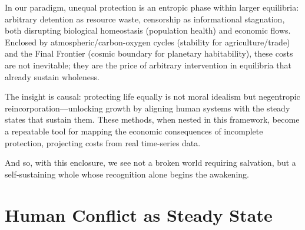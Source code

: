 In our paradigm, unequal protection is an entropic phase within larger equilibria: arbitrary detention as resource waste, censorship as informational stagnation, both disrupting biological homeostasis (population health) and economic flows. Enclosed by atmospheric/carbon-oxygen cycles (stability for agriculture/trade) and the Final Frontier (cosmic boundary for planetary habitability), these costs are not inevitable; they are the price of arbitrary intervention in equilibria that already sustain wholeness.

The insight is causal: protecting life equally is not moral idealism but negentropic reincorporation—unlocking growth by aligning human systems with the steady states that sustain them. These methods, when nested in this framework, become a repeatable tool for mapping the economic consequences of incomplete protection, projecting costs from real time-series data.

And so, with this enclosure, we see not a broken world requiring salvation, but a self-sustaining whole whose recognition alone begins the awakening.

\chapter{Human Conflict as Steady State}

